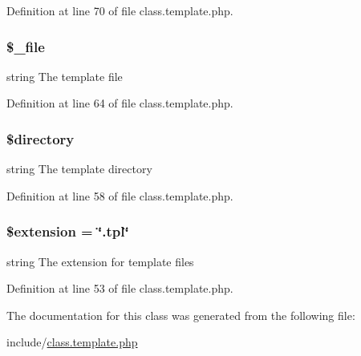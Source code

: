 Definition at line 70 of file class.\-template.\-php.

\hypertarget{class_template_abddaf0b77086e2b7d920f5d1a9616889}{
\subsubsection[{\$\-\_\-file}]{\setlength{\rightskip}{0pt plus 5cm}\$\-\_\-file\hspace{0.3cm}{\ttfamily [protected]}}}\label{class_template_abddaf0b77086e2b7d920f5d1a9616889}
string The template file 

Definition at line 64 of file class.\-template.\-php.

\hypertarget{class_template_a1b07c630eb02f770a082a013373a16d6}{
\subsubsection[{\$directory}]{\setlength{\rightskip}{0pt plus 5cm}\$directory}}\label{class_template_a1b07c630eb02f770a082a013373a16d6}
string The template directory 

Definition at line 58 of file class.\-template.\-php.

\hypertarget{class_template_aed02cd2cd0ee08bd99a2ac1ef4f955ce}{
\subsubsection[{\$extension}]{\setlength{\rightskip}{0pt plus 5cm}\$extension = \char`\"{}.tpl\char`\"{}}}\label{class_template_aed02cd2cd0ee08bd99a2ac1ef4f955ce}
string The extension for template files 

Definition at line 53 of file class.\-template.\-php.



The documentation for this class was generated from the following file\-:\begin{DoxyCompactItemize}
\item 
include/\hyperlink{class_8template_8php}{class.\-template.\-php}\end{DoxyCompactItemize}
